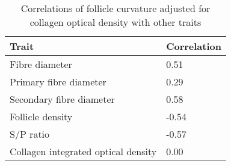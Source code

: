 %

\begin{table}[htp]
\centering
\caption{Correlations of follicle curvature adjusted for collagen optical density with other traits}
\label{tab:fcadjccor}
\vspace{0.1in}
\begin{tabular}{|p{3.0in}|p{1.0in}|}  \hline
       Trait  &  Correlation  \\ 
\hline 
Fibre diameter & 0.51 \\
Primary fibre diameter & 0.29 \\
Secondary fibre diameter & 0.58 \\
Follicle density & -0.54 \\
S/P ratio & -0.57 \\
Collagen integrated optical density & 0.00 \\

\hline

\end{tabular}
\end{table}

%

